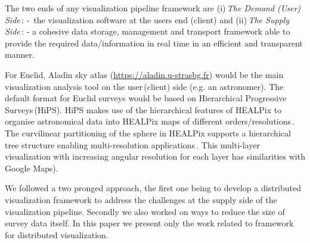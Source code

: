 \documentclass[11pt,twoside]{article}
\begin{document}
The two ends of any visualization pipeline framework are (i)\,{\emph {The Demand (User) Side}\,:} - \,the visualization software at the users end (client) and (ii)\,{\emph {The Supply Side}\,:} - a cohesive data storage, management and transport framework able to provide the required data/information in real time in an efficient and transparent manner. 

For Euclid, Aladin sky atlas (\url{https://aladin.u-strasbg.fr}) would be the main  visualization analysis tool on the user\,(client) side  (e.g. an astronomer). %
The default format for Euclid surveys would be based on Hierarchical Progressive Surveys\,(HiPS). HiPS  makes use of the hierarchical features of HEALPix to organise astronomical data into HEALPix maps of different orders/resolutions\,\citep{2015A&A...578A.114F}. The curvilinear partitioning of the sphere in HEALPix supports a hierarchical tree structure enabling multi-resolution applications\,\citep{2005ApJ...622..759G}. This multi-layer visualization with increasing angular resolution for each layer has similarities with Google Maps). 

We followed a two pronged approach, the first one being to develop a distributed visualization framework  to address the challenges at the  supply side of the visualization pipeline.   Secondly we also worked on ways to reduce the size of survey data itself. In this paper we  present only the work related to framework for  distributed visualization.
\end{document}
